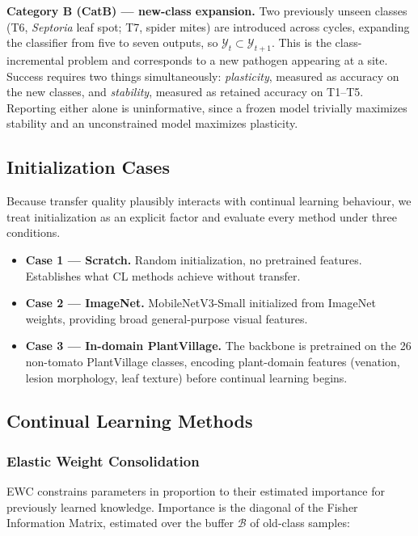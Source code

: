 \documentclass[journal]{IEEEtran}
\begin{document}
\textbf{Category B (CatB) --- new-class expansion.} Two previously unseen classes
(T6, \textit{Septoria} leaf spot; T7, spider mites) are introduced across cycles,
expanding the classifier from five to seven outputs, so
$\mathcal{Y}_t \subset \mathcal{Y}_{t+1}$. This is the class-incremental problem and
corresponds to a new pathogen appearing at a site. Success requires two things
simultaneously: \emph{plasticity}, measured as accuracy on the new classes, and
\emph{stability}, measured as retained accuracy on T1--T5. Reporting either alone is
uninformative, since a frozen model trivially maximizes stability and an
unconstrained model maximizes plasticity.

\subsection{Initialization Cases}

Because transfer quality plausibly interacts with continual learning behaviour, we
treat initialization as an explicit factor and evaluate every method under three
conditions.

\begin{itemize}
\item \textbf{Case 1 --- Scratch.} Random initialization, no pretrained features.
Establishes what CL methods achieve without transfer.
\item \textbf{Case 2 --- ImageNet.} MobileNetV3-Small initialized from ImageNet
weights, providing broad general-purpose visual features.
\item \textbf{Case 3 --- In-domain PlantVillage.} The backbone is pretrained on the
26 non-tomato PlantVillage classes, encoding plant-domain features (venation,
lesion morphology, leaf texture) before continual learning begins.
\end{itemize}

\subsection{Continual Learning Methods}

\subsubsection{Elastic Weight Consolidation}
EWC \cite{ref15} constrains parameters in proportion to their estimated importance
for previously learned knowledge. Importance is the diagonal of the Fisher
Information Matrix, estimated over the buffer $\mathcal{B}$ of old-class samples:
\end{document}
